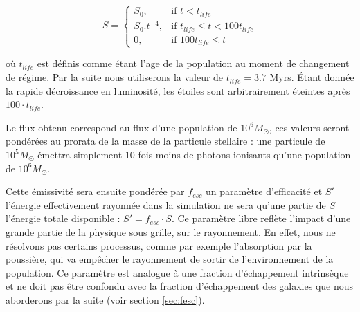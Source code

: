 \begin{equation}
    S = 
\begin{cases}
    S_0 ,         & \text{if } t < t_{life}\\
    S_0.t^{-4},   & \text{if } t_{life} \leq t < 100t_{life} \\
    0,   & \text{if } 100t_{life} \leq t
\end{cases}
\end{equation}

où $t_{life}$ est définis comme étant l'age de la population au moment de changement de régime.
Par la suite nous utiliserons la valeur de $t_{life} = 3.7$ Myrs.
Étant donnée la rapide décroissance en luminosité, les étoiles sont arbitrairement éteintes après $100 \cdot t_{life}$.

Le flux obtenu correspond au flux d'une population de $10^6M_\odot$, ces valeurs seront pondérées au prorata de la masse de la particule stellaire : une particule de $10^5M_\odot$ émettra simplement 10 fois moins de photons ionisants qu'une population de $10^6 M_\odot$.

Cette émissivité sera ensuite pondérée par $f_{esc}$ un paramètre d'efficacité et $S'$ l'énergie effectivement rayonnée dans la simulation ne sera qu'une partie de $S$ l'énergie totale disponible : $S' = f_{esc} \cdot S$.
Ce paramètre libre reflète l'impact d'une grande partie de la physique sous grille, sur le rayonnement.
En effet, nous ne résolvons pas certains processus, comme par exemple l'absorption par la poussière, qui va empêcher le rayonnement de sortir de l’environnement de la population.
Ce paramètre est analogue à une fraction d'échappement intrinsèque et ne doit pas être confondu avec la fraction d'échappement des galaxies que nous aborderons par la suite (voir section \ref{sec:fesc}).



